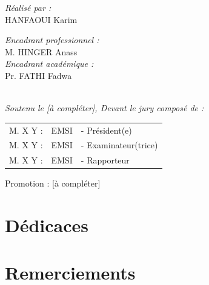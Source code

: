\documentclass[a4paper,11pt,oneside]{report}
\begin{document}
\begin{titlepage}
\noindent
\begin{minipage}{0.5\textwidth}
\vspace{-7mm}
\begin{flushleft} \large
\emph{Réalisé par :}\\{}
HANFAOUI Karim \\
\end{flushleft}
\end{minipage}
\begin{minipage}{0.4\textwidth}
\begin{flushright} \large
\emph{Encadrant professionnel :} \\{}
M. HINGER Anass \\[0.2cm]
\emph{Encadrant académique :} \\{}
Pr. FATHI Fadwa \\
\end{flushright}
\end{minipage}\\[1cm]

{\large \textit{Soutenu le [à compléter], Devant le jury composé de : }}\\[0.5cm]

\centering
\begin{tabular}{lll}
\large M. X Y : & \large EMSI & \large - Président(e) \\[0.1cm]
\large M. X Y : & \large EMSI & \large - Examinateur(trice) \\[0.1cm]
\large M. X Y : & \large EMSI & \large - Rapporteur
\end{tabular}

\vspace{20mm}
{\large Promotion : [à compléter]}
\end{titlepage}

\chapter*{Dédicaces}
\thispagestyle{empty}

\vspace{1cm}

\clearpage
\chapter*{Remerciements}
\thispagestyle{empty}
\end{document}
